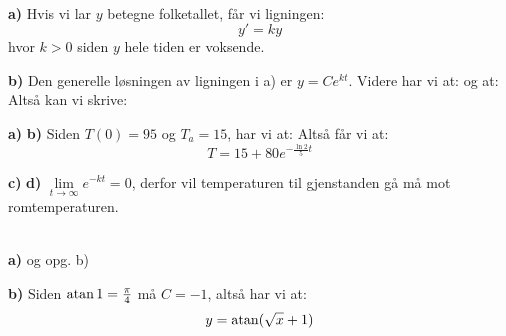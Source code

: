 \\
\textbf{a)} Hvis vi lar $ y $ betegne folketallet, får vi ligningen:
\[ y'=ky \]
hvor $ k>0 $ siden $ y $ hele tiden er voksende.

\textbf{b)} Den generelle løsningen av ligningen i a) er $ y=Ce^{kt} $. Videre har vi at:
og at:
Altså kan vi skrive:

\textbf{a)}
\textbf{b)} Siden $ T(0)=95 $ og $ T_a=15 $, har vi at:
Altså får vi at:
\[ T = 15+80e^{-\frac{\ln 2}{5}t} \]

\textbf{c)} 
\textbf{d)} $\lim\limits_{t\to\infty} e^{-kt}= 0 $, derfor vil temperaturen til gjenstanden gå må mot romtemperaturen.

 \\
\textbf{a)}  og opg. b)

\textbf{b)} 
Siden $ \operatorname{atan} 1 = \frac{\pi}{4} $ må $ C=-1 $, altså har vi at:
\[ y =\operatorname{atan}(\sqrt{x}+1) \]

